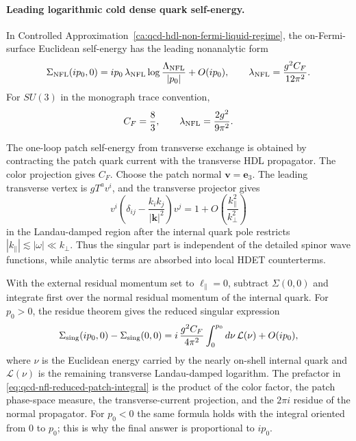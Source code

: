 \paragraph{Leading logarithmic cold dense quark self-energy.}
In Controlled Approximation~\ref{ca:qcd-hdl-non-fermi-liquid-regime}, the
on-Fermi-surface Euclidean self-energy has the leading nonanalytic form
\begin{equation}
  \Sigma_{\rm NFL}(ip_0,0)
  =
  ip_0\,\lambda_{\rm NFL}
  \log\frac{\Lambda_{\rm NFL}}{|p_0|}
  +O(ip_0),
  \qquad
  \lambda_{\rm NFL}
  =
  \frac{g^2C_F}{12\pi^2}.
  \label{eq:qcd-leading-nfl-self-energy}
\end{equation}
For \(SU(3)\) in the monograph trace convention,
\begin{equation}
  C_F=\frac83,
  \qquad
  \lambda_{\rm NFL}=\frac{2g^2}{9\pi^2}.
  \label{eq:qcd-leading-nfl-self-energy-su3}
\end{equation}

The one-loop patch self-energy from transverse exchange is obtained by
contracting the patch quark current with the transverse HDL propagator.  The
color projection gives \(C_F\).  Choose the patch normal
\(\mathbf v=\mathbf e_3\).  The leading transverse vertex is
\(gT^a v^i\), and the transverse projector gives
\[
  v^i\left(\delta_{ij}-\frac{k_i k_j}{|\mathbf k|^2}\right)v^j
  =
  1+O\!\left(\frac{k_\parallel^2}{k_\perp^2}\right)
\]
in the Landau-damped region after the internal quark pole restricts
\(|k_\parallel|\lesssim |\omega|\ll k_\perp\).  Thus the singular part is
independent of the detailed spinor wave functions, while analytic terms are
absorbed into local HDET counterterms.

With the external residual momentum set to \(\ell_\parallel=0\), subtract
\(\Sigma(0,0)\) and integrate first over the normal residual momentum of the
internal quark.  For \(p_0>0\), the residue theorem gives the reduced
singular expression
\begin{equation}
  \Sigma_{\rm sing}(ip_0,0)-\Sigma_{\rm sing}(0,0)
  =
  i\,\frac{g^2C_F}{4\pi^2}
  \int_0^{p_0}d\nu\,
  \mathcal L(\nu)
  +O(ip_0),
  \label{eq:qcd-nfl-reduced-patch-integral}
\end{equation}
where \(\nu\) is the Euclidean energy carried by the nearly on-shell
internal quark and \(\mathcal L(\nu)\) is the remaining transverse
Landau-damped logarithm.  The prefactor in
\eqref{eq:qcd-nfl-reduced-patch-integral} is the product of the color
factor, the patch phase-space measure, the transverse-current projection,
and the \(2\pi i\) residue of the normal propagator.  For \(p_0<0\) the same
formula holds with the integral oriented from \(0\) to \(p_0\); this is why
the final answer is proportional to \(ip_0\).

